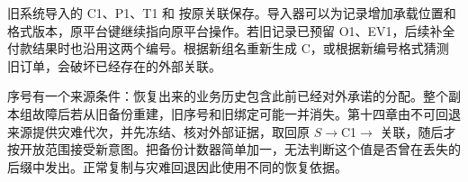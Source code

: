 旧系统导入的 C1、P1、T1 和  按原关联保存。导入器可以为记录增加承载位置和格式版本，原平台键继续指向原平台操作。若旧记录已预留 O1、EV1，后续补全付款结果时也沿用这两个编号。根据新组名重新生成 C，或根据新编号格式猜测旧订单，会破坏已经存在的外部关联。


序号有一个来源条件：恢复出来的业务历史包含此前已经对外承诺的分配。整个副本组故障后若从旧备份重建，旧序号和旧绑定可能一并消失。第十四章由不可回退来源提供灾难代次，并先冻结、核对外部证据，取回原 $S\to$C1$\to$ 关联，随后才按开放范围接受新意图。把备份计数器简单加一，无法判断这个值是否曾在丢失的后缀中发出。正常复制与灾难回退因此使用不同的恢复依据。
\FloatBarrier
